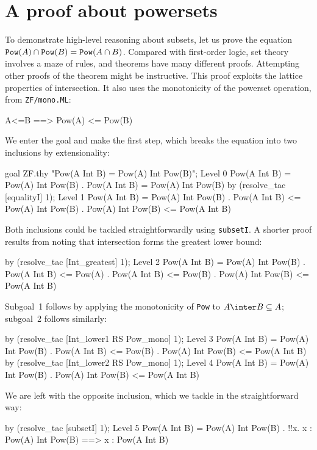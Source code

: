 \section{A proof about powersets}
To demonstrate high-level reasoning about subsets, let us prove the
equation ${{\tt Pow}(A)\cap {\tt Pow}(B)}= {\tt Pow}(A\cap B)$.  Compared
with first-order logic, set theory involves a maze of rules, and theorems
have many different proofs.  Attempting other proofs of the theorem might
be instructive.  This proof exploits the lattice properties of
intersection.  It also uses the monotonicity of the powerset operation,
from {\tt ZF/mono.ML}:
\begin{ttbox}
      A<=B ==> Pow(A) <= Pow(B)
\end{ttbox}
We enter the goal and make the first step, which breaks the equation into
two inclusions by extensionality:
\begin{ttbox}
goal ZF.thy "Pow(A Int B) = Pow(A) Int Pow(B)";
{\out Level 0}
{\out Pow(A Int B) = Pow(A) Int Pow(B)}
{. Pow(A Int B) = Pow(A) Int Pow(B)}
\ttbreak
by (resolve_tac [equalityI] 1);
{\out Level 1}
{\out Pow(A Int B) = Pow(A) Int Pow(B)}
{. Pow(A Int B) <= Pow(A) Int Pow(B)}
{. Pow(A) Int Pow(B) <= Pow(A Int B)}
\end{ttbox}
Both inclusions could be tackled straightforwardly using {\tt subsetI}.
A shorter proof results from noting that intersection forms the greatest
lower bound:
\begin{ttbox}
by (resolve_tac [Int_greatest] 1);
{\out Level 2}
{\out Pow(A Int B) = Pow(A) Int Pow(B)}
{. Pow(A Int B) <= Pow(A)}
{. Pow(A Int B) <= Pow(B)}
{. Pow(A) Int Pow(B) <= Pow(A Int B)}
\end{ttbox}
Subgoal~1 follows by applying the monotonicity of {\tt Pow} to $A\inter
B\subseteq A$; subgoal~2 follows similarly:
\begin{ttbox}
by (resolve_tac [Int_lower1 RS Pow_mono] 1);
{\out Level 3}
{\out Pow(A Int B) = Pow(A) Int Pow(B)}
{. Pow(A Int B) <= Pow(B)}
{. Pow(A) Int Pow(B) <= Pow(A Int B)}
\ttbreak
by (resolve_tac [Int_lower2 RS Pow_mono] 1);
{\out Level 4}
{\out Pow(A Int B) = Pow(A) Int Pow(B)}
{. Pow(A) Int Pow(B) <= Pow(A Int B)}
\end{ttbox}
We are left with the opposite inclusion, which we tackle in the
straightforward way:
\begin{ttbox}
by (resolve_tac [subsetI] 1);
{\out Level 5}
{\out Pow(A Int B) = Pow(A) Int Pow(B)}
{. !!x. x : Pow(A) Int Pow(B) ==> x : Pow(A Int B)}
\end{ttbox}
